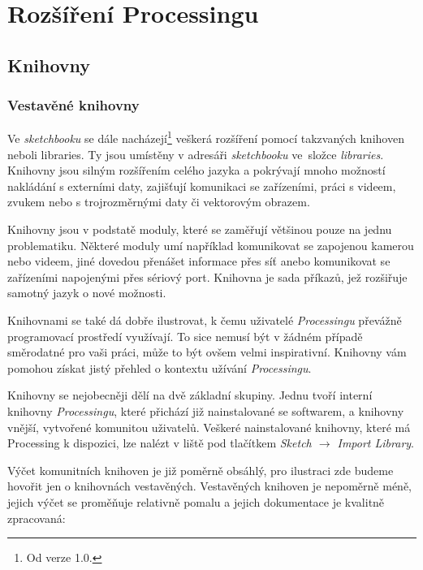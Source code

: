 \documentclass[10pt,twoside=true,open=right,cleardoublepage=empty,chapterprefix=true]{scrbook}
\newcommand{\poznamka}[1]{\footnote{\/ #1}}
\newcommand{\oddil}[1]{\section{#1}\index{#1}\label{#1}}
\newcommand{\pododdil}[1]{\subsection{#1}\index{#1}\label{#1}}
\newcommand{\lnb}{\linebreak}
\begin{document}
\vfill
\chapter{Rozšíření Processingu}
\oddil{Knihovny}

\pododdil{Vestavěné knihovny}

Ve {\em sketchbooku} se dále nacházejí\poznamka{Od verze 1.0.} veškerá rozšíření pomocí takzvaných knihoven neboli libraries. Ty jsou umístěny v adresáři {\em sketchbooku} ve~slož\-ce {\em libraries}. Knihovny jsou silným rozšířením celého jazyka a pokrývají \lnb mnoho možností nakládání s externími daty, zajišťují komunikaci se zařízeními, práci s videem, zvukem nebo s trojrozměrnými daty či vektorovým obrazem.


Knihovny jsou v podstatě moduly, které se zaměřují většinou pouze na jednu problematiku. Některé moduly umí například komunikovat se zapojenou kamerou nebo videem, jiné dovedou přenášet informace přes síť anebo komunikovat se zařízeními napojenými přes sériový port. Knihovna je sada příkazů, jež rozšiřuje samotný jazyk o nové možnosti.


Knihovnami se také dá dobře ilustrovat, k čemu uživatelé {\em Processingu} převážně programovací prostředí využívají. To sice nemusí být v žádném případě směrodatné pro vaši práci, může to být ovšem velmi inspirativní. Knihovny vám pomohou získat jistý přehled o kontextu užívání {\em Processingu}.

Knihovny se  nejobecněji dělí na dvě základní skupiny. Jednu tvoří inter\-ní knihovny {\em Processingu}, které přichází již nainstalované se softwarem, a knihovny vnější, vytvořené komunitou uživatelů. Veškeré nainstalované knihovny, které má Processing k dispozici, lze nalézt v liště pod tlačítkem {\em Sketch $\rightarrow$ Import Library}.


Výčet komunitních knihoven je již poměrně obsáhlý, pro ilustraci zde budeme hovořit jen o knihovnách vestavěných. Vestavěných knihoven je nepoměrně méně, jejich výčet se proměňuje relativně pomalu a jejich dokumentace je kvalitně zpracovaná:
\end{document}
